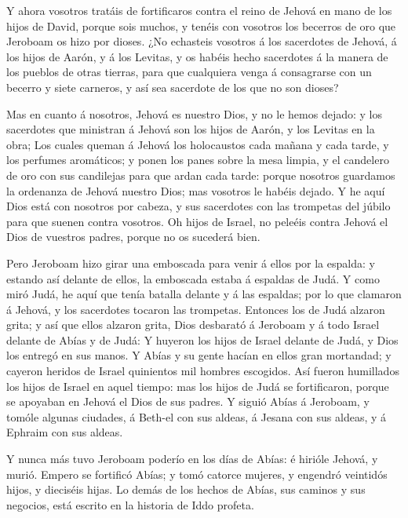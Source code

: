  Y ahora vosotros tratáis de fortificaros contra el reino de
Jehová en mano de los hijos de David, porque sois muchos, y tenéis con
vosotros los becerros de oro que Jeroboam os hizo por dioses.
 ¿No echasteis vosotros á los sacerdotes de Jehová, á los
hijos de Aarón, y á los Levitas, y os habéis hecho sacerdotes á la
manera de los pueblos de otras tierras, para que cualquiera venga á
consagrarse con un becerro y siete carneros, y así sea sacerdote de los
que no son dioses?

 Mas en cuanto á nosotros, Jehová es nuestro Dios, y no le
hemos dejado: y los sacerdotes que ministran á Jehová son los hijos de
Aarón, y los Levitas en la obra;  Los cuales queman á
Jehová los holocaustos cada mañana y cada tarde, y los perfumes
aromáticos; y ponen los panes sobre la mesa limpia, y el candelero de
oro con sus candilejas para que ardan cada tarde: porque nosotros
guardamos la ordenanza de Jehová nuestro Dios; mas vosotros le habéis
dejado.  Y he aquí Dios está con nosotros por cabeza, y sus
sacerdotes con las trompetas del júbilo para que suenen contra vosotros.
Oh hijos de Israel, no peleéis contra Jehová el Dios de vuestros padres,
porque no os sucederá bien.

 Pero Jeroboam hizo girar una emboscada para venir á ellos
por la espalda: y estando así delante de ellos, la emboscada estaba á
espaldas de Judá.  Y como miró Judá, he aquí que tenía
batalla delante y á las espaldas; por lo que clamaron á Jehová, y los
sacerdotes tocaron las trompetas.  Entonces los de Judá
alzaron grita; y así que ellos alzaron grita, Dios desbarató á Jeroboam
y á todo Israel delante de Abías y de Judá:  Y huyeron los
hijos de Israel delante de Judá, y Dios los entregó en sus manos.
 Y Abías y su gente hacían en ellos gran mortandad; y
cayeron heridos de Israel quinientos mil hombres escogidos.
 Así fueron humillados los hijos de Israel en aquel tiempo:
mas los hijos de Judá se fortificaron, porque se apoyaban en Jehová el
Dios de sus padres.  Y siguió Abías á Jeroboam, y tomóle
algunas ciudades, á Beth-el con sus aldeas, á Jesana con sus aldeas, y á
Ephraim con sus aldeas.

 Y nunca más tuvo Jeroboam poderío en los días de Abías: é
hirióle Jehová, y murió.  Empero se fortificó Abías; y tomó
catorce mujeres, y engendró veintidós hijos, y dieciséis hijas.
 Lo demás de los hechos de Abías, sus caminos y sus
negocios, está escrito en la historia de Iddo profeta.

